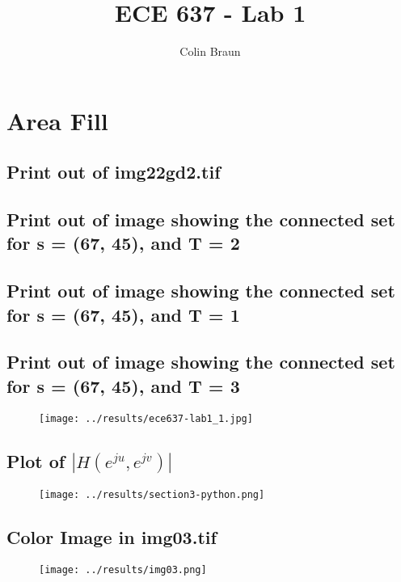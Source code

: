 \documentclass{article}
\title{ECE 637 - Lab 1}
\author{Colin Braun}
\begin{document}
\maketitle

\section{Area Fill}
\subsection{Print out of img22gd2.tif}
\subsection{Print out of image showing the connected set for s = (67, 45), and T = 2}
\subsection{Print out of image showing the connected set for s = (67, 45), and T = 1}
\subsection{Print out of image showing the connected set for s = (67, 45), and T = 3}
\begin{figure}[H]
    \centering
    \texttt{[image: ../results/ece637-lab1\_1.jpg]}
    \begin{center}
    \end{center}
\end{figure}
\subsection{Plot of $|H(e^{ju}, e^{jv})|$}
\begin{figure}[H]
    \centering
    \texttt{[image: ../results/section3-python.png]}
    \begin{center}
    \end{center}
\end{figure}
\subsection{Color Image in img03.tif}
\begin{figure}[H]
    \centering
    \texttt{[image: ../results/img03.png]}
    \begin{center}
    \end{center}
\end{figure}
\end{document}
